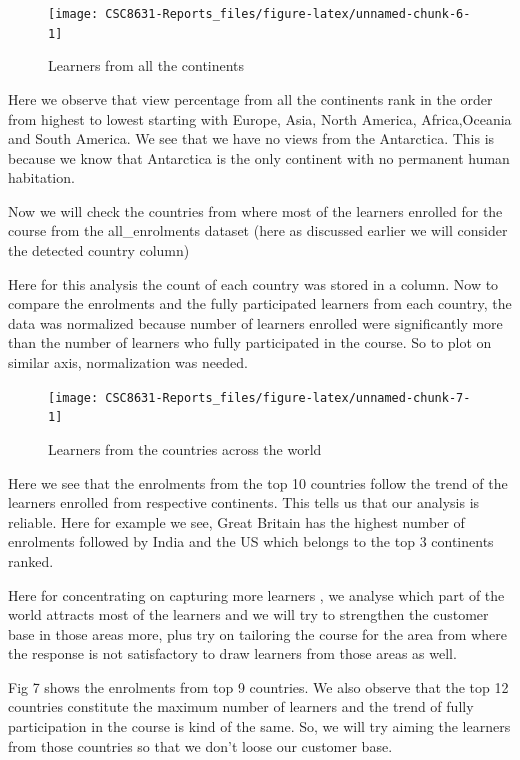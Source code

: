 \documentclass[
]{article}
\begin{document}
\begin{figure}
\texttt{[image: CSC8631-Reports\_files/figure-latex/unnamed-chunk-6-1]} \caption{Learners from all the continents}\label{fig:unnamed-chunk-6}
\end{figure}

Here we observe that view percentage from all the continents rank in the
order from highest to lowest starting with Europe, Asia, North America,
Africa,Oceania and South America. We see that we have no views from the
Antarctica. This is because we know that Antarctica is the only
continent with no permanent human habitation.

Now we will check the countries from where most of the learners enrolled
for the course from the all\_enrolments dataset (here as discussed
earlier we will consider the detected country column)

Here for this analysis the count of each country was stored in a column.
Now to compare the enrolments and the fully participated learners from
each country, the data was normalized because number of learners
enrolled were significantly more than the number of learners who fully
participated in the course. So to plot on similar axis, normalization
was needed.

\begin{figure}
\texttt{[image: CSC8631-Reports\_files/figure-latex/unnamed-chunk-7-1]} \caption{Learners from the countries across the world}\label{fig:unnamed-chunk-7}
\end{figure}

Here we see that the enrolments from the top 10 countries follow the
trend of the learners enrolled from respective continents. This tells us
that our analysis is reliable. Here for example we see, Great Britain
has the highest number of enrolments followed by India and the US which
belongs to the top 3 continents ranked.

Here for concentrating on capturing more learners , we analyse which
part of the world attracts most of the learners and we will try to
strengthen the customer base in those areas more, plus try on tailoring
the course for the area from where the response is not satisfactory to
draw learners from those areas as well.

Fig 7 shows the enrolments from top 9 countries. We also observe that
the top 12 countries constitute the maximum number of learners and the
trend of fully participation in the course is kind of the same. So, we
will try aiming the learners from those countries so that we don't loose
our customer base.
\end{document}
